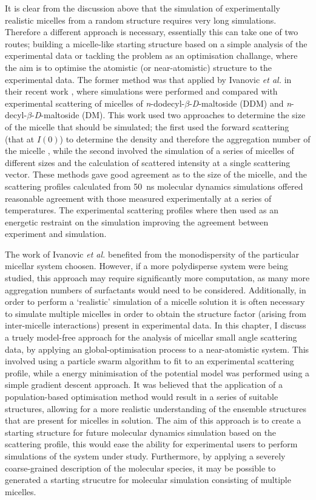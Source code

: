 It is clear from the discussion above that the simulation of experimentally realistic micelles from a random structure requires very long simulations.
Therefore a different approach is necessary, essentially this can take one of two routes; building a micelle-like starting structure based on a simple analysis of the experimental data or tackling the problem as an optimisation challange, where the aim is to optimise the atomistic (or near-atomistic) structure to the experimental data.
The former method was that applied by Ivanovic \emph{et al.} in their recent work \cite{ivanovic_temperature-dependent_2018}, where simulations were performed and compared with experimental scattering of micelles of \emph{n}-dodecyl-$\beta$-\emph{D}-maltoside (DDM) and \emph{n}-decyl-$\beta$-\emph{D}-maltoside (DM).
This work used two approaches to determine the size of the micelle that should be simulated; the first used the forward scattering (that at $I(0)$) to determine the density and therefore the aggregation number of the micelle \cite{lipfert_size_2007}, while the second involved the simulation of a series of micelles of different sizes and the calculation of scattered intensity at a single scattering vector.
These methods gave good agreement as to the size of the micelle, and the scattering profiles calculated from \SI{50}{\nano\second} molecular dynamics simulations offered reasonable agreement with those measured experimentally at a series of temperatures.
The experimental scattering profiles where then used as an energetic restraint on the simulation improving the agreement between experiment and simulation.

The work of Ivanovic \emph{et al.} benefited from the monodispersity of the particular micellar system choosen.
However, if a more polydisperse system were being studied, this approach may require significantly more computation, as many more aggregation numbers of surfactants would need to be considered.
Additionally, in order to perform a `realistic' simulation of a micelle solution it is often necessary to simulate multiple micelles in order to obtain the structure factor (arising from inter-micelle interactions) present in experimental data.
In this chapter, I discuss a truely model-free approach for the analysis of micellar small angle scattering data, by applying an global-optimisation process to a near-atomistic system.
This involved using a particle swarm algorithm to fit to an experimental scattering profile, while a energy minimisation of the potential model was performed using a simple gradient descent approach.
It was believed that the application of a population-based optimisation method would result in a series of suitable structures, allowing for a more realistic understanding of the ensemble structures that are present for micelles in solution.
The aim of this approach is to create a starting structure for future molecular dynamics simulation based on the scattering profile, this would ease the ability for experimental users to perform simulations of the system under study.
Furthermore, by applying a severely coarse-grained description of the molecular species, it may be possible to generated a starting strucutre for molecular simulation consisting of multiple micelles.
